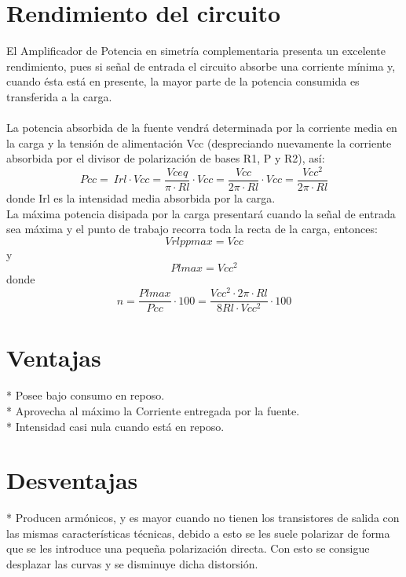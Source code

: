 \documentclass[12pt,a4paper]{article}
\begin{document}
\newpage
\section{Rendimiento del circuito}
El Amplificador de Potencia en simetría complementaria presenta un excelente rendimiento, pues si señal de entrada el circuito absorbe una corriente mínima y, cuando ésta está en presente, la mayor parte de la potencia consumida es transferida a la carga.\\\\
La potencia absorbida de la fuente vendrá determinada por la corriente media en la carga y la tensión de alimentación Vcc (despreciando nuevamente la corriente absorbida por el divisor de polarización de bases R1, P y R2), así: 
\begin{equation}
Pcc = \ Irl \cdot Vcc=\frac{Vceq}{\pi \cdot Rl} \cdot Vcc=\frac{Vcc}{2 \pi \cdot Rl} \cdot Vcc=\frac{Vcc^{2}}{2 \pi \cdot Rl}
\end{equation}
donde Irl es la intensidad media absorbida por la carga.\\

La máxima potencia disipada por la carga presentará cuando la señal de entrada sea máxima y el punto de trabajo recorra toda la recta de la carga, entonces: 
\begin{equation}
Vrlpp max = Vcc
\end{equation}
y
\begin{equation}
Pl max = Vcc^{2} 
\end{equation}
donde
\begin{equation}
n = \frac{Pl max}{Pcc} \cdot 100 = \frac{Vcc^{2} \cdot 2 \pi \cdot Rl}{8Rl \cdot Vcc ^{2}} \cdot 100 
\end{equation}

\section{Ventajas}
* Posee bajo consumo en reposo.\\
* Aprovecha al máximo la Corriente entregada por la fuente.\\
* Intensidad casi nula cuando está en reposo.\\

\section{Desventajas}
* Producen armónicos, y es mayor cuando no tienen los transistores de salida con las mismas características técnicas, debido a esto se les suele polarizar de forma que se les introduce una pequeña polarización directa. Con esto se consigue desplazar las curvas y se disminuye dicha distorsión.
\end{document}

